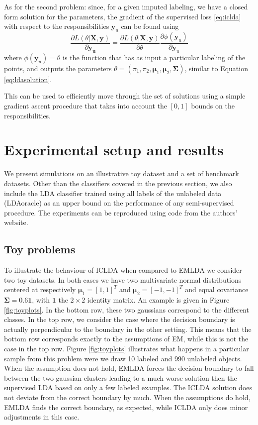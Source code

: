 \documentclass[10pt, a4paper, conference]{IEEEtran}
\begin{document}
As for the second problem: since, for a given imputed labeling, we have a closed form solution for the parameters, the gradient of the supervised loss \eqref{eq:iclda} with respect to the responsibilities $\mathbf{y}_u$ can be found using
\begin{equation}
\frac{\partial L(\theta|\mathbf{X},\mathbf{y})}{\partial \mathbf{y_u}} = \frac{\partial L(\theta|\mathbf{X},\mathbf{y})}{\partial \theta} \frac{\partial \phi(\mathbf{y}_u)}{\partial \mathbf{y}_u} 
\end{equation}
where $\phi(\mathbf{y}_u)=\theta$ is the function that has as input a particular labeling of the points, and outputs the parameters $\theta=\left(\pi_1,\pi_2, \boldsymbol{\mu}_1,\boldsymbol{\mu}_2,\mathbf{\Sigma}\right)$, similar to Equation \eqref{eq:ldasolution}.

This can be used to efficiently move through the set of solutions using a simple gradient ascent procedure that takes into account the $[0,1]$ bounds on the responsibilities.

\section{Experimental setup and results}
We present simulations on an illustrative toy dataset and a set of benchmark datasets. Other than the classifiers covered in the previous section, we also include the LDA classifier trained using all labels of the unlabeled data (LDAoracle) as an upper bound on the performance of any semi-supervised procedure. The experiments can be reproduced using code from the authors' website. 

\subsection{Toy problems}
To illustrate the behaviour of ICLDA when compared to EMLDA we consider two toy datasets. In both cases we have two multivariate normal distributions centered at respectively $\boldsymbol{\mu}_1=[1,1]^T$ and $\boldsymbol{\mu}_2=[-1,-1]^T$ and equal covariance $\mathbf{\Sigma}=0.6 \mathbf{1}$, with $\mathbf{1}$ the $2 \times 2$ identity matrix. An example is given in Figure \ref{fig:toyplots}. In the bottom row, these two gaussians correspond to the different classes. In the top row, we consider the case where the decision boundary is actually perpendicular to the boundary in the other setting. This means that the bottom row corresponds exactly to the assumptions of EM, while this is not the case in the top row. Figure \ref{fig:toyplots} illustrates what happens in a particular sample from this problem were we draw 10 labeled and 990 unlabeled objects. When the assumption does not hold, EMLDA forces the decision boundary to fall between the two gaussian clusters leading to a much worse solution then the supervised LDA based on only a few labeled examples. The ICLDA solution does not deviate from the correct boundary by much. When the assumptions do hold, EMLDA finds the correct boundary, as expected, while ICLDA only does minor adjustments in this case. 
\end{document}
